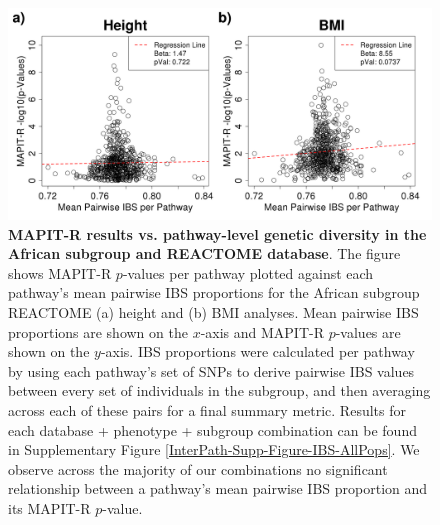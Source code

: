 \documentclass[12pt,a4paper]{article}
\begin{document}

\begin{figure}[htb]
\centering
\includegraphics[scale=.35]{Images/Main/InterPath_Main_Figure_IBS_vs4_African_REACTOME_noHLA.png}
\caption[TBD]{\textbf{MAPIT-R results vs. pathway-level genetic diversity in the African subgroup and REACTOME database}. The figure shows MAPIT-R $p$-values per pathway plotted against each pathway's mean pairwise IBS proportions for the African subgroup REACTOME (a) height and (b) BMI analyses. Mean pairwise IBS proportions are shown on the $x$-axis and MAPIT-R $p$-values are shown on the $y$-axis. IBS proportions were calculated per pathway by using each pathway's set of SNPs to derive pairwise IBS values between every set of individuals in the subgroup, and then averaging across each of these pairs for a final summary metric. Results for each database + phenotype + subgroup combination can be found in Supplementary Figure \ref{InterPath-Supp-Figure-IBS-AllPops}. We observe across the majority of our combinations no significant relationship between a pathway's mean pairwise IBS proportion and its MAPIT-R $p$-value.}
\label{InterPath-Main-Figure-IBS-African}
\end{figure}
\end{document}
